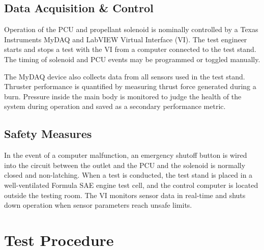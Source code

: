 \documentclass[journal]{IEEEtran}
\begin{document}
\subsection{Data Acquisition \& Control}
Operation of the PCU and propellant solenoid is nominally controlled by a Texas Instruments MyDAQ and LabVIEW Virtual Interface (VI).
The test engineer starts and stops a test with the VI from a computer connected to the test stand. The timing of solenoid and PCU events may be programmed or toggled manually.

The MyDAQ device also collects data from all sensors used in the test stand.
Thruster performance is quantified by measuring thrust force generated during a burn.
Pressure inside the main body is monitored to judge the health of the system during operation and saved as a secondary performance metric.

\subsection{Safety Measures}
In the event of a computer malfunction, an emergency shutoff button is wired into the circuit between the outlet and the PCU and the solenoid is normally closed and non-latching.
When a test is conducted, the test stand is placed in a well-ventilated Formula SAE engine test cell, and the control computer is located outside the testing room.
The VI monitors sensor data in real-time and shuts down operation when sensor parameters reach unsafe limits.


\section{Test Procedure}
\end{document}
